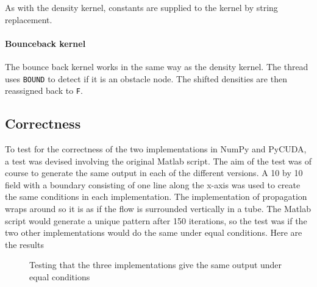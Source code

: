 As with the density kernel, constants are supplied to the kernel by string replacement.


\paragraph{Bounceback kernel}
The bounce back kernel works in the same way as the density kernel. The thread uses \texttt{BOUND} to detect if it is an obstacle node. The shifted densities are then reassigned back to \texttt{F}.




\subsection{Correctness}
To test for the correctness of the two implementations in NumPy and PyCUDA, a test was devised involving the original Matlab script. The aim of the test was of course to generate the same output in each of the different versions. A 10 by 10 field with a boundary consisting of one line along the x-axis was used to create the same conditions in each implementation. The implementation of propagation wraps around so it is as if the flow is surrounded vertically in a tube. The Matlab script would generate a unique pattern after 150 iterations, so the test was if the two other implementations would do the same under equal conditions. Here are the results

\begin{figure}[H]
\centering
{}
\hspace{1pt}
\caption{Testing that the three implementations give the same output under equal conditions}
\label{correctness}
\end{figure}

